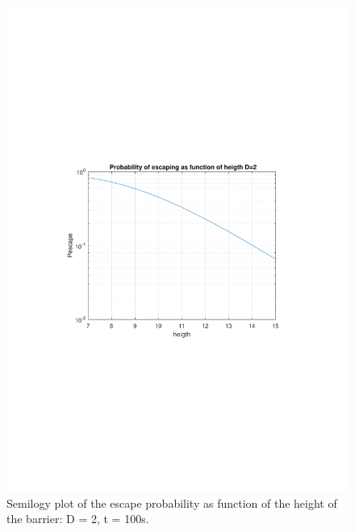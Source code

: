 \documentclass[11pt,letterpaper]{article}
\begin{document}
\begin{figure}
\centering
\includegraphics[width=1\linewidth]{./arrhenius2}
\caption{Semilogy plot of the escape probability as function of the height of the barrier: D = 2, t = 100s.}
\label{fig:arrhenius2}
\end{figure}
\end{document}
